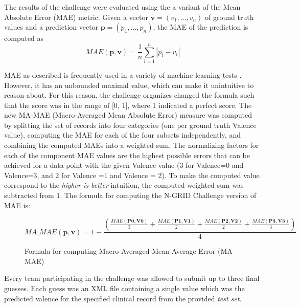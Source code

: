 The results of the challenge were evaluated using the a variant of the \textsf{Mean Absolute Error (MAE)} metric.  Given a vector $\mathbf{v} = (v_1,\ldots,v_n)$ of ground truth values and a prediction vector $\mathbf{p} = (p_1,\ldots, p_n)$, the \textsf{MAE} of the prediction is computed as  $$ MAE(\mathbf{p},\mathbf{v}) = \frac{1}{n}\sum_{i=1}^{n}| p_i - v_i|$$

\textsf{MAE} as described is frequently used in a variety of machine learning tests \cite{willmott2005advantages}. However, it has an unbounded maximal value, which can make it unintuitive to reason about. For this reason, the challenge organizes changed the formula such that the score was in the range of [0, 1], where 1 indicated a perfect score. The new \textsf{MA-MAE} (\textsf{Macro-Averaged Mean Absolute Error}) measure was computed
by splitting the set of records into four categories (one per ground truth \textsf{Valence} value), computing the \textsf{MAE} for each of the four subsets independently, and combining the computed \textsf{MAE}s into a weighted sum. The normalizing factors
for each of the component \textsf{MAE} values are the highest possible errors that
can be achieved for a data point with the given \textsf{Valence} value
($3$ for \textsf{Valence=0} and \textsf{Valence=3}, and $2$ for
\textsf{Valence =1} and \textsf{Valence = 2}).
To make the computed value correspond to the
\textit{higher is better} intuition, the computed weighted sum was subtracted from $1$.
The formula for computing the N-GRID Challenge version of \textsf{MAE} is:

\begin{figure}[H]
$$ MA\_MAE(\mathbf{p},\mathbf{v}) = 1 - 
    \frac{(\frac{MAE(\mathbf{P0}, \mathbf{V0})}{3} + 
     \frac{MAE(\mathbf{P1}, \mathbf{V1})}{2} + 
     \frac{MAE(\mathbf{P2}, \mathbf{V2})}{2} + 
     \frac{MAE(\mathbf{P3}, \mathbf{V3})}{3})}{4} $$
 \caption{Formula for computing Macro-Averaged Mean Average Error (MA-MAE)}
 \end{figure}


Every team participating in the challenge was allowed to submit up to three final guesses. Each guess was an XML file containing a single value which was the predicted valence for the specified clinical record from the provided \textit{test set}.

